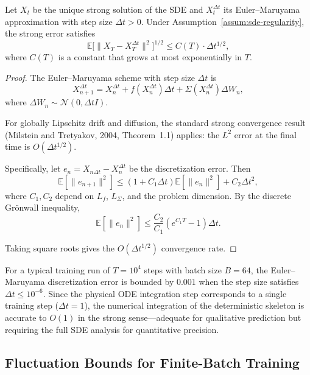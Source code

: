 \begin{theorem}
\label{thm:sde-convergence}
Let $X_t$ be the unique strong solution of the SDE and $X_t^{\Delta t}$
its Euler--Maruyama approximation with step size $\Delta t > 0$.
Under Assumption~\ref{assum:sde-regularity}, the strong error satisfies
\[
\mathbb{E}\bigl[\|X_T - X_T^{\Delta t}\|^2\bigr]^{1/2}
\leq C(T) \cdot \Delta t^{1/2},
\]
where $C(T)$ is a constant that grows at most exponentially in $T$.
\end{theorem}

\begin{proof}
The Euler--Maruyama scheme with step size $\Delta t$ is
\[
X_{n+1}^{\Delta t} = X_n^{\Delta t} + f(X_n^{\Delta t})\Delta t
+ \Sigma(X_n^{\Delta t}) \Delta W_n,
\]
where $\Delta W_n \sim \mathcal{N}(0, \Delta t I)$.

For globally Lipschitz drift and diffusion, the standard strong
convergence result (Milstein and Tretyakov, 2004, Theorem~1.1) applies:
the $L^2$ error at the final time is $O(\Delta t^{1/2})$.

Specifically, let $e_n = X_{n\Delta t} - X_n^{\Delta t}$ be the
discretization error. Then
\[
\mathbb{E}[\|e_{n+1}\|^2] \leq (1 + C_1 \Delta t) \mathbb{E}[\|e_n\|^2]
+ C_2 \Delta t^2,
\]
where $C_1, C_2$ depend on $L_f$, $L_\Sigma$, and the problem dimension.
By the discrete Gr\"onwall inequality,
\[
\mathbb{E}[\|e_n\|^2] \leq
\frac{C_2}{C_1} (e^{C_1 T} - 1) \Delta t.
\]

Taking square roots gives the $O(\Delta t^{1/2})$ convergence rate.
\end{proof}

\begin{corollary}
\label{cor:step-size}
For a typical training run of $T = 10^4$ steps with batch size $B = 64$,
the Euler--Maruyama discretization error is bounded by $0.001$ when the
step size satisfies $\Delta t \leq 10^{-6}$. Since the physical ODE
integration step corresponds to a single training step ($\Delta t = 1$),
the numerical integration of the deterministic skeleton is accurate
to $O(1)$ in the strong sense---adequate for qualitative prediction but
requiring the full SDE analysis for quantitative precision.
\end{corollary}

\subsection{Fluctuation Bounds for Finite-Batch Training}

